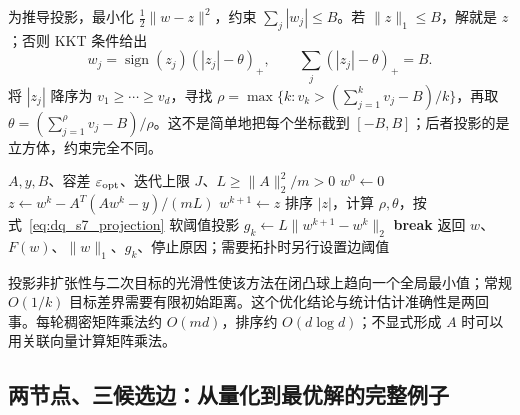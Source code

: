 \documentclass[UTF8,11pt,fontset=fandol,openany,oneside]{ctexbook}
\theoremstyle{definition}
\theoremstyle{remark}
\numberwithin{equation}{chapter}
\begin{document}
为推导投影，最小化 $\frac12\|w-z\|^2$，约束 $\sum_j|w_j|\le B$。若 $\|z\|_1\le B$，解就是 $z$；否则 KKT 条件给出
\begin{equation}
 w_j=\operatorname{sign}(z_j)(|z_j|-\theta)_+,
 \qquad \sum_j(|z_j|-\theta)_+=B.
 \label{eq:dq_s7_projection}
\end{equation}
将 $|z_j|$ 降序为 $v_1\ge\cdots\ge v_d$，寻找
$\rho=\max\{k:v_k>(\sum_{j=1}^kv_j-B)/k\}$，再取
$\theta=(\sum_{j=1}^{\rho}v_j-B)/\rho$。这不是简单地把每个坐标截到 $[-B,B]$；后者投影的是立方体，约束完全不同。

\begin{algorithm}[tbp]
\caption{S7 约束估计器的教学实现：投影梯度}
\label{alg:dq_s7_pg}
\begin{algorithmic}[1]
\Require $A,y,B$、容差 $\varepsilon_{\rm opt}$、迭代上限 $J$、$L\ge\|A\|_2^2/m>0$
\State $w^0\gets0$
 \State $z\gets w^k-A^T(Aw^k-y)/(mL)$
   \State $w^{k+1}\gets z$
 \Else
   \State 排序 $|z|$，计算 $\rho,\theta$，按式~\eqref{eq:dq_s7_projection} 软阈值投影
 \EndIf
 \State $g_k\gets L\|w^{k+1}-w^k\|_2$
   \State \textbf{break}
 \EndIf
\EndFor
\State 返回 $w$、$F(w)$、$\|w\|_1$、$g_k$、停止原因；需要拓扑时另行设置边阈值
\end{algorithmic}
\end{algorithm}

投影非扩张性与二次目标的光滑性使该方法在闭凸球上趋向一个全局最小值；常规 $O(1/k)$ 目标差界需要有限初始距离。这个优化结论与统计估计准确性是两回事。每轮稠密矩阵乘法约 $O(md)$，排序约 $O(d\log d)$；不显式形成 $A$ 时可以用关联向量计算矩阵乘法。

\subsection{两节点、三候选边：从量化到最优解的完整例子}
\end{document}
